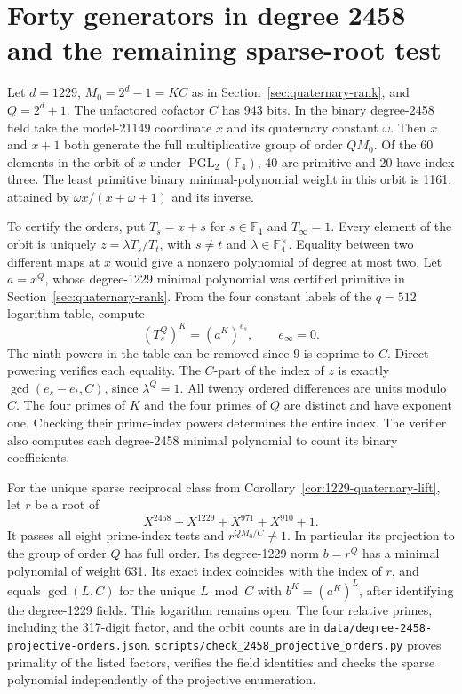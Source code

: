 \documentclass[11pt]{article}
\begin{document}
\clearpage
\section{Forty generators in degree 2458 and the remaining sparse-root test}
\label{sec:2458-projective-orders}
Let \(d=1229\), \(M_0=2^d-1=KC\) as in
Section~\ref{sec:quaternary-rank}, and \(Q=2^d+1\). The unfactored
cofactor \(C\) has 943 bits. In the binary degree-2458 field take the
model-21149 coordinate \(x\) and its quaternary constant \(\omega\).
Then \(x\) and \(x+1\) both generate the full multiplicative group of
order \(QM_0\). Of the 60 elements in the orbit of \(x\) under
\(\operatorname{PGL}_2(\mathbb F_4)\), 40 are primitive and 20 have
index three. The least primitive binary minimal-polynomial weight in
this orbit is 1161, attained by \(\omega x/(x+\omega+1)\) and its inverse.

To certify the orders, put \(T_s=x+s\) for \(s\in\mathbb F_4\) and
\(T_\infty=1\). Every element of the orbit is uniquely
\(z=\lambda T_s/T_t\), with \(s\ne t\) and
\(\lambda\in\mathbb F_4^\times\). Equality between two different maps
at \(x\) would give a nonzero polynomial of degree at most two.
Let \(a=x^Q\), whose degree-1229 minimal polynomial was certified
primitive in Section~\ref{sec:quaternary-rank}. From the four constant
labels of the \(q=512\) logarithm table, compute
\[
             (T_s^Q)^K=(a^K)^{e_s},\qquad e_\infty=0.
\]
The ninth powers in the table can be removed since \(9\) is coprime
to \(C\). Direct powering verifies each equality. The \(C\)-part of
the index of \(z\) is exactly \(\gcd(e_s-e_t,C)\), since
\(\lambda^Q=1\). All twenty ordered differences are units modulo \(C\).
The four primes of \(K\) and the four primes of \(Q\) are distinct
and have exponent one. Checking their prime-index powers determines
the entire index. The verifier also computes each degree-2458
minimal polynomial to count its binary coefficients.

For the unique sparse reciprocal class from
Corollary~\ref{cor:1229-quaternary-lift}, let \(r\) be a root of
\[
                   X^{2458}+X^{1229}+X^{971}+X^{910}+1.
\]
It passes all eight prime-index tests and \(r^{QM_0/C}\ne1\).
In particular its projection to the group of order \(Q\) has full
order. Its degree-1229 norm \(b=r^Q\) has a minimal polynomial of
weight 631. Its exact index coincides with the index of \(r\), and
equals \(\gcd(L,C)\) for the unique \(L\bmod C\) with
\(b^K=(a^K)^L\), after identifying the degree-1229 fields.
This logarithm remains open. The four relative primes, including the
317-digit factor, and the orbit counts are in
\nolinkurl{data/degree-2458-projective-orders.json}.
\nolinkurl{scripts/check_2458_projective_orders.py} proves primality
of the listed factors, verifies the field identities and checks the
sparse polynomial independently of the projective enumeration.
\end{document}
